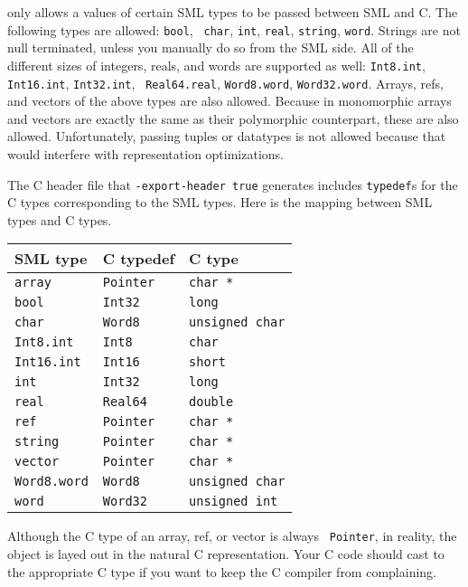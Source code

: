{\mlton} only allows a values of certain SML types to be passed
between SML and C.  The following types are allowed: {\tt bool}, {\tt
char}, {\tt int}, {\tt real}, {\tt string}, {\tt word}.  Strings are
not null terminated, unless you manually do so from the SML side.  All
of the different sizes of integers, reals, and words are supported as
well: {\tt Int8.int}, {\tt Int16.int}, {\tt Int32.int}, {\tt
Real64.real}, {\tt Word8.word}, {\tt Word32.word}.  Arrays, refs, and
vectors of the above types are also allowed.  Because in {\mlton}
monomorphic arrays and vectors are exactly the same as their
polymorphic counterpart, these are also allowed.  Unfortunately,
passing tuples or datatypes is not allowed because that would
interfere with representation optimizations.

The C header file that {\tt -export-header true} generates includes
{\tt typedef}s for the C types corresponding to the SML types.  Here
is the mapping between SML types and C types.

\begin{center}
\begin{tabular}{lll}
SML type & C typedef & C type\\
\hline
{\tt array} & {\tt Pointer} & {\tt char *} \\
{\tt bool} & {\tt Int32} & {\tt long} \\
{\tt char} & {\tt Word8} & {\tt unsigned char} \\
{\tt Int8.int} & {\tt Int8} & {\tt char} \\
{\tt Int16.int} & {\tt Int16} & {\tt short} \\
{\tt int} & {\tt Int32} & {\tt long} \\
{\tt real} & {\tt Real64} & {\tt double} \\
{\tt ref} & {\tt Pointer} & {\tt char *} \\
{\tt string} & {\tt Pointer} & {\tt char *} \\
{\tt vector} & {\tt Pointer} & {\tt char *} \\
{\tt Word8.word} & {\tt Word8} & {\tt unsigned char} \\
{\tt word} & {\tt Word32} & {\tt unsigned int} \\
\end{tabular}
\end{center}

Although the C type of an array, ref, or vector is always {\tt
Pointer}, in reality, the object is layed out in the natural C
representation.  Your C code should cast to the appropriate C type if
you want to keep the C compiler from complaining.

